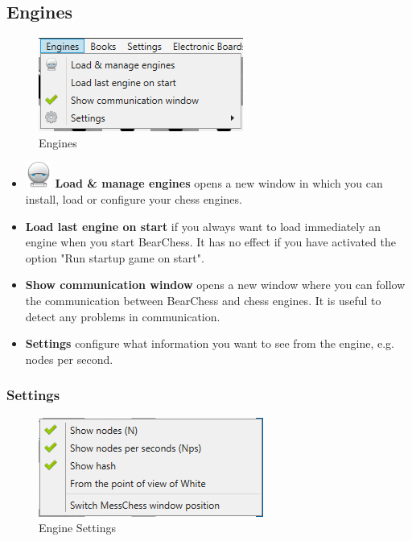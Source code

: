 \documentclass[11pt,a4paper]{article}
\begin{document}
\subsection{Engines}
\begin{figure}[H]
	\centering
	\includegraphics[scale=1.0]{Engines.png}
	\caption{Engines}
	\label{fig:Engines}
\end{figure}
\begin{itemize}
	\item  \includegraphics[scale=0.5]{robot.png} \textbf{Load \& manage engines} opens a new window in which you can install, load or configure your chess engines.
	\item \textbf{Load last engine on start} if you always want to load immediately an engine when you start BearChess. It has no effect if you have activated the option "Run startup game on start".
	\item \textbf{Show communication window} opens a new window where you can follow the communication between BearChess and chess engines. It is useful to detect any problems in communication.
	\item \textbf{Settings} configure what information you want to see from the engine, e.g. nodes per second.	
\end{itemize}

\subsubsection{Settings}
\begin{figure}[H]
	\centering
	\includegraphics[scale=1.0]{engineSettings.png}
	\caption{Engine Settings}
	\label{fig:EngineSettings}
\end{figure}
\end{document}
